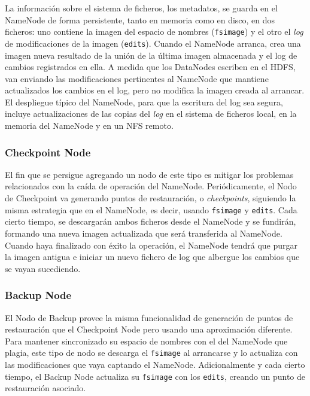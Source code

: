 La informaci\'on sobre el sistema de ficheros, los metadatos, se guarda en el NameNode de forma persistente, tanto en memoria como en disco, en dos ficheros: uno contiene la imagen del espacio de nombres (\texttt{fsimage}) y el otro el \emph{log} de modificaciones de la imagen (\texttt{edits}). Cuando el NameNode arranca, crea una imagen nueva resultado de la uni\'on de la \'ultima imagen almacenada y el log de cambios registrados en ella. A medida que los DataNodes escriben en el HDFS, van enviando las modificaciones pertinentes al NameNode que mantiene actualizados los cambios en el log, pero no modifica la imagen creada al arrancar. El despliegue t\'ipico del NameNode, para que la escritura del log sea segura, incluye actualizaciones de las copias del \emph{log} en el sistema de ficheros local, en la memoria del NameNode y en un NFS remoto.


\subsubsection{Checkpoint Node}\label{subsubsec:checkpointnode}
\noindent El fin que se persigue agregando un nodo de este tipo es mitigar los problemas relacionados con la ca\'ida de operaci\'on del NameNode. Peri\'odicamente, el Nodo de Checkpoint va generando puntos de restauraci\'on, o \emph{checkpoints}, siguiendo la misma estrategia que en el NameNode, es decir, usando \texttt{fsimage} y \texttt{edits}. Cada cierto tiempo, se descargar\'an ambos ficheros desde el NameNode y se fundir\'an, formando una nueva imagen actualizada que ser\'a transferida al NameNode. Cuando haya finalizado con \'exito la operaci\'on, el NameNode tendr\'a que purgar la imagen antigua e iniciar un nuevo fichero de log que albergue los cambios que se vayan sucediendo.


\subsubsection{Backup Node}\label{subsubsec:backupnode}
\noindent El Nodo de Backup provee la misma funcionalidad de generaci\'on de puntos de restauraci\'on que el Checkpoint Node pero usando una aproximaci\'on diferente. Para mantener sincronizado su espacio de nombres con el del NameNode que plagia, este tipo de nodo se descarga el \texttt{fsimage} al arrancarse y lo actualiza con las modificaciones que vaya captando el NameNode. Adicionalmente y cada cierto tiempo, el Backup Node actualiza su \texttt{fsimage} con los \texttt{edits}, creando un punto de restauraci\'on asociado.\newline

